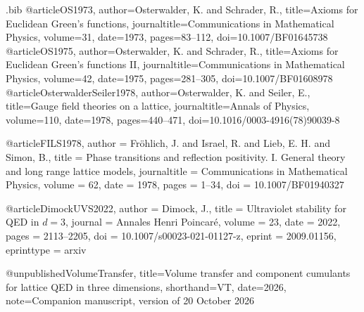 \begin{filecontents*}[overwrite]{\jobname.bib}
@article{OS1973,
 author={Osterwalder, K. and Schrader, R.},
 title={Axioms for {Euclidean} {Green's} functions},
 journaltitle={Communications in Mathematical Physics},
 volume={31}, date={1973}, pages={83--112}, doi={10.1007/BF01645738}}
@article{OS1975,
 author={Osterwalder, K. and Schrader, R.},
 title={Axioms for {Euclidean} {Green's} functions {II}},
 journaltitle={Communications in Mathematical Physics},
 volume={42}, date={1975}, pages={281--305}, doi={10.1007/BF01608978}}
@article{OsterwalderSeiler1978,
 author={Osterwalder, K. and Seiler, E.},
 title={Gauge field theories on a lattice},
 journaltitle={Annals of Physics}, volume={110}, date={1978},
 pages={440--471}, doi={10.1016/0003-4916(78)90039-8}}

@article{FILS1978,
  author = {Fr\"ohlich, J. and Israel, R. and Lieb, E. H. and Simon, B.},
  title = {Phase transitions and reflection positivity.
    {I}. General theory and long range lattice models},
  journaltitle = {Communications in Mathematical Physics},
  volume = {62}, date = {1978}, pages = {1--34},
  doi = {10.1007/BF01940327}
}

@article{DimockUVS2022,
  author = {Dimock, J.},
  title = {Ultraviolet stability for {QED} in {$d=3$}},
  journal = {Annales Henri Poincar\'e},
  volume = {23},
  date = {2022},
  pages = {2113--2205},
  doi = {10.1007/s00023-021-01127-z},
  eprint = {2009.01156},
  eprinttype = {arxiv}
}

@unpublished{VolumeTransfer,
 title={Volume transfer and component cumulants for lattice {QED} in three dimensions},
 shorthand={VT}, date={2026}, note={Companion manuscript, version of 20 October 2026}}
\end{filecontents*}
\documentclass[11pt,letterpaper,reqno]{amsart}
\makeatletter
{}[2020/10/01]

\RequirePackage[T1]{fontenc}
\RequirePackage{lmodern}
\RequirePackage{microtype}
\RequirePackage[letterpaper,margin=1in,headheight=15pt]{geometry}
\RequirePackage{amsmath,amsthm,amssymb,mathtools}
\RequirePackage{enumitem}
\RequirePackage{perpage}
\RequirePackage{xcolor}
\RequirePackage[breaklinks=true,colorlinks=true,
  linkcolor=manuscriptred,citecolor=manuscriptblue,urlcolor=manuscriptmagenta]{hyperref}
\RequirePackage{cleveref}

